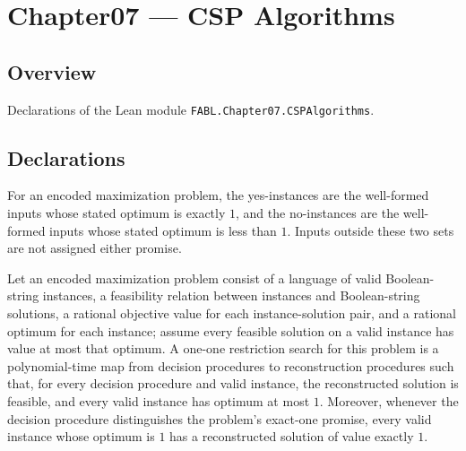 \chapter{Chapter07 — CSP Algorithms}
\section{Overview}

Declarations of the Lean module \texttt{FABL.Chapter07.CSPAlgorithms}.

\section{Declarations}

\begin{definition}
\label{FABL.EncodedMaximizationProblem.exactOnePromise}
\leanok
{}
For an encoded maximization problem, the yes-instances are the well-formed inputs whose
stated optimum is exactly $1$, and the no-instances are the well-formed inputs whose
stated optimum is less than $1$. Inputs outside these two sets are not assigned either
promise.
\end{definition}

\begin{definition}
\label{FABL.OneOneRestrictionSearch}
\leanok
{}
Let an encoded maximization problem consist of a language of valid Boolean-string
instances, a feasibility relation between instances and Boolean-string solutions, a
rational objective value for each instance-solution pair, and a rational optimum for
each instance; assume every feasible solution on a valid instance has value at most that
optimum. A one-one restriction search for this problem is a polynomial-time map from
decision procedures to reconstruction procedures such that, for every decision procedure
and valid instance, the reconstructed solution is feasible, and every valid instance has
optimum at most $1$. Moreover, whenever the decision procedure distinguishes the
problem’s exact-one promise, every valid instance whose optimum is $1$ has a
reconstructed solution of value exactly $1$.
\end{definition}

